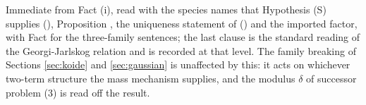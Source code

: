 Immediate from Fact (i), read with the species names that Hypothesis (S) supplies (), Proposition , the uniqueness statement of \cite[Prop.~9.32]{ButlerT12} () and the imported factor, with Fact  for the three-family sentences; the last clause is the standard reading of the Georgi-Jarlskog relation and is recorded at that level. The family breaking of Sections \ref{sec:koide} and \ref{sec:gaussian} is unaffected by this: it acts on whichever two-term structure the mass mechanism supplies, and the modulus $\delta$ of successor problem (3) is read off the result.
